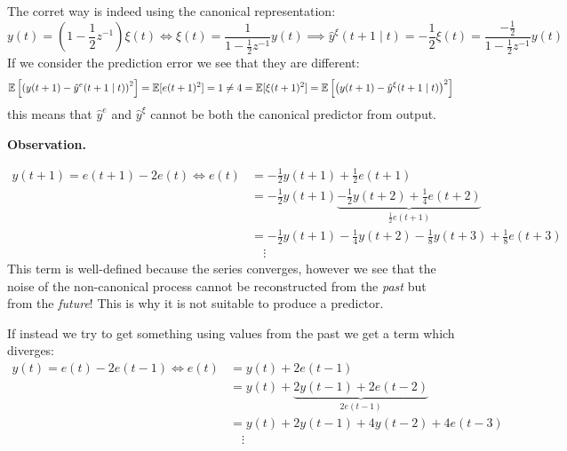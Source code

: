 The corret way is indeed using the canonical representation:
\[
	y(t) = \left( 1-\frac{1}{2} z^{-1}  \right) \xi(t) \iff \xi(t) = \frac{1}{1-\frac{1}{2} z^{-1} } y(t) \implies \boxed{\hat y^{\xi} (t+1\mid t)= -\frac{1}{2} \xi(t) = \frac{-\frac{1}{2} }{1-\frac{1}{2} z^{-1} } y(t)}
\]
If we consider the prediction error we see that they are different:
\[
	\mathbb{E}\left[ \left( y(t+1)-\hat y^{e}(t+1\mid t)  \right) ^2   \right]  =\mathbb{E}[e(t+1)^2 ]=1\neq 4=\mathbb{E}[\xi(t+1)^2 ]=\mathbb{E}\left[ \left( y(t+1)-\hat y ^{\xi}(t+1\mid t)  \right)^2    \right]  
\]
this means that $\hat y^{e} $ and $\hat y^{\xi} $ cannot be both the canonical predictor from output.

\textbf{Observation.}

\begin{align*}
	y(t+1)=e(t+1)-2e(t) \iff e(t)&=-\frac{1}{2} y(t+1)+\frac{1}{2} e(t+1)\\
	&= -\frac{1}{2} y(t+1)\underbrace{-\frac{1}{2} y(t+2)+\frac{1}{4}e(t+2)}_{\frac{1}{2} e(t+1)}\\
	&= -\frac{1}{2} y(t+1)-\frac{1}{4}y(t+2)-\frac{1}{8}y(t+3)+\frac{1}{8}e(t+3)\\
	&\quad\vdots
\end{align*}
This term is well-defined because the series converges, however we see that the noise of the non-canonical process cannot be reconstructed from the \emph{past} but from the \emph{future}! This is why it is not suitable to produce a predictor.

If instead we try to get something using values from the past we get a term which diverges:
\begin{align*}
	y(t)=e(t)-2e(t-1) \iff e(t)&=y(t)+2e(t-1)\\
	&=y(t)+\underbrace{2y(t-1)+2e(t-2)}_{2e(t-1)}\\
	&=y(t)+2y(t-1)+4y(t-2)+4e(t-3)\\
	&\quad\vdots
\end{align*}




